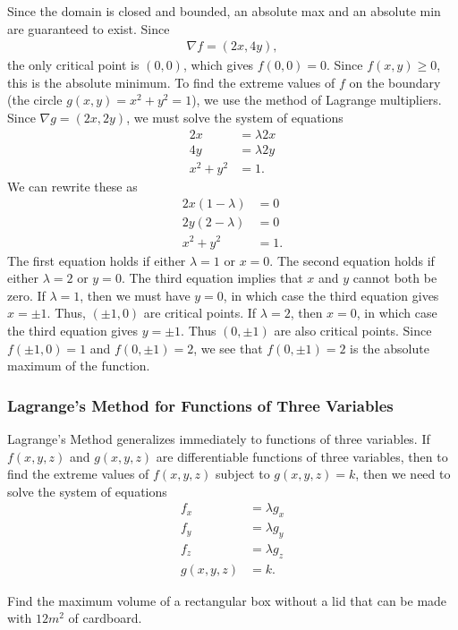 \documentclass[12pt,letterpaper,reqno]{article}
\numberwithin{equation}{section}
\begin{document}
{\begin{solution}
Since the domain is closed and bounded, an absolute max and an absolute min are guaranteed to exist. Since
\begin{align*}
	\nabla f=(2x,4y),
\end{align*}	
the only critical point is $(0,0)$, which gives $f(0,0)=0$. Since $f(x,y) \geq 0$, this is the absolute minimum. To find the extreme values of $f$ on the boundary (the circle $g(x,y)=x^2+y^2=1$), we use the method of Lagrange multipliers. Since $\nabla g=(2x,2y)$, we must solve the system of equations 
\begin{align*}
	2x&=\lambda 2x \\
	4y&=\lambda 2y \\
	x^2+y^2&=1.
\end{align*}
We can rewrite these as 
\begin{align*}
	2x(1-\lambda)&=0 \\
	2y(2-\lambda)&=0 \\
	x^2+y^2&=1.
\end{align*}
The first equation holds if either $\lambda=1$ or $x=0$. The second equation holds if either $\lambda=2$ or $y=0$. The third equation implies that $x$ and $y$ cannot both be zero. If $\lambda=1$, then we must have $y=0$, in which case the third equation gives $x=\pm 1$. Thus, $(\pm 1,0)$ are critical points. If $\lambda=2$, then $x=0$, in which case the third equation gives $y=\pm 1$. Thus $(0,\pm 1)$ are also critical points. Since $f(\pm 1,0)=1$ and $f(0,\pm 1)=2$, we see that $f(0,\pm 1)=2$ is the absolute maximum of the function.
\end{solution}
\subsubsection{Lagrange's Method for Functions of Three Variables}
Lagrange's Method generalizes immediately to functions of three variables. If $f(x,y,z)$ and $g(x,y,z)$ are differentiable functions of three variables, then to find the extreme values of $f(x,y,z)$ subject to $g(x,y,z)=k$, then we need to solve the system of equations
\begin{align*}
	f_x&=\lambda g_x \\
	f_y&=\lambda g_y \\
	f_z&=\lambda g_z \\
	g(x,y,z)&=k.
\end{align*}

\begin{example}
Find the maximum volume of a rectangular box without a lid that can be made with $12m^2$ of cardboard.	
\end{example}

}
\end{document}
